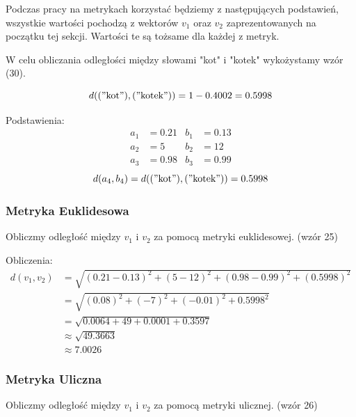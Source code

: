\documentclass{article}
\begin{document}
\noindent Podczas pracy na metrykach korzystać będziemy z następujących podstawień, wszystkie wartości pochodzą z wektorów \(v_1\) oraz \(v_2\) zaprezentowanych na początku tej sekcji. Wartości te są tożsame dla każdej z metryk. \newline

\noindent W celu obliczania odległości między słowami "kot" i "kotek" wykożystamy wzór (30). \newline

\begin{equation}
    d(("\text{kot}"), ("\text{kotek}")) = 1 - 0.4002 = 0.5998
\end{equation}

\noindent Podstawienia:
\begin{align*}
a_1 &= 0.21 & b_1 &= 0.13 \\
a_2 &= 5 & b_2 &= 12 \\
a_3 &= 0.98 & b_3 &= 0.99 
\end{align*}
\[ d(a_4, b_4) = d(("\text{kot}"), ("\text{kotek}")) = 0.5998\]



\subsubsection*{Metryka Euklidesowa}

Obliczmy odległość między \( v_1 \) i \( v_2 \) za pomocą metryki euklidesowej. (wzór 25) \newline

Obliczenia:
\begin{equation}
\begin{split}
d(v_1, v_2) &= \sqrt{(0.21 - 0.13)^2 + (5 - 12)^2 + (0.98 - 0.99)^2 + (0.5998)^2} \\
&= \sqrt{(0.08)^2 + (-7)^2 + (-0.01)^2 + 0.5998^2} \\
&= \sqrt{0.0064 + 49 + 0.0001 + 0.3597} \\
&\approx \sqrt{49.3663} \\
&\approx  7.0026
\end{split}
\end{equation}


\subsubsection*{Metryka Uliczna}

Obliczmy odległość między \( v_1 \) i \( v_2 \) za pomocą metryki ulicznej. (wzór 26) \newline
\end{document}
